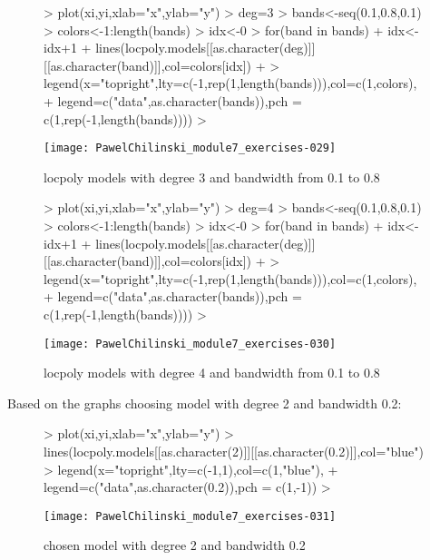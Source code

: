 \documentclass[a4paper]{article}
\begin{document}
\begin{figure}[H]
\begin{center}
\begin{Schunk}
\begin{Sinput}
> plot(xi,yi,xlab="x",ylab="y")
> deg=3
> bands<-seq(0.1,0.8,0.1)
> colors<-1:length(bands)
> idx<-0
> for(band in bands){
+ 	idx<-idx+1
+ 	lines(locpoly.models[[as.character(deg)]][[as.character(band)]],col=colors[idx])		
+ }
> legend(x="topright",lty=c(-1,rep(1,length(bands))),col=c(1,colors), 
+ 		legend=c("data",as.character(bands)),pch = c(1,rep(-1,length(bands))))
> 
\end{Sinput}
\end{Schunk}
\texttt{[image: PawelChilinski\_module7\_exercises-029]}
\caption{locpoly models with degree 3 and bandwidth from 0.1 to 0.8}
\end{center}
\end{figure}

\begin{figure}[H]
\begin{center}
\begin{Schunk}
\begin{Sinput}
> plot(xi,yi,xlab="x",ylab="y")
> deg=4
> bands<-seq(0.1,0.8,0.1)
> colors<-1:length(bands)
> idx<-0
> for(band in bands){
+ 	idx<-idx+1
+ 	lines(locpoly.models[[as.character(deg)]][[as.character(band)]],col=colors[idx])		
+ }
> legend(x="topright",lty=c(-1,rep(1,length(bands))),col=c(1,colors), 
+ 		legend=c("data",as.character(bands)),pch = c(1,rep(-1,length(bands))))
> 
\end{Sinput}
\end{Schunk}
\texttt{[image: PawelChilinski\_module7\_exercises-030]}
\caption{locpoly models with degree 4 and bandwidth from 0.1 to 0.8}
\end{center}
\end{figure}

Based on the graphs choosing model with degree 2 and bandwidth 0.2:

\begin{figure}[H]
\begin{center}
\begin{Schunk}
\begin{Sinput}
> plot(xi,yi,xlab="x",ylab="y")
> lines(locpoly.models[[as.character(2)]][[as.character(0.2)]],col="blue")		
> legend(x="topright",lty=c(-1,1),col=c(1,"blue"), 
+ 		legend=c("data",as.character(0.2)),pch = c(1,-1))
> 
\end{Sinput}
\end{Schunk}
\texttt{[image: PawelChilinski\_module7\_exercises-031]}
\caption{chosen model with degree 2 and bandwidth 0.2}
\end{center}
\end{figure}
\end{document}
